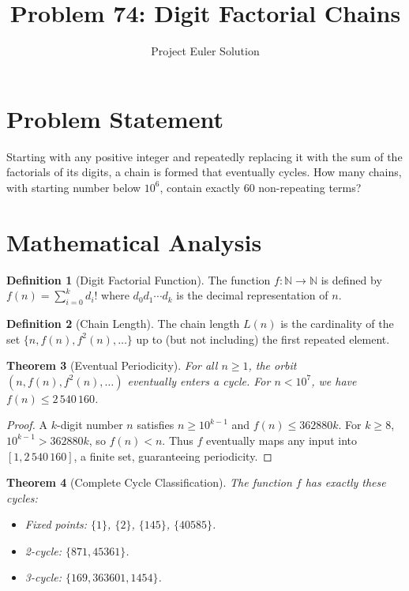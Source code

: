 \documentclass[12pt,a4paper]{article}
\title{Problem 74: Digit Factorial Chains}
\author{Project Euler Solution}
\date{}
\newtheorem{theorem}{Theorem}
\theoremstyle{definition}
\newtheorem{definition}[theorem]{Definition}
\begin{document}
\maketitle

\section{Problem Statement}

Starting with any positive integer and repeatedly replacing it with the sum of the factorials of its digits, a chain is formed that eventually cycles. How many chains, with starting number below $10^6$, contain exactly 60 non-repeating terms?

\section{Mathematical Analysis}

\begin{definition}[Digit Factorial Function]
The function $f: \mathbb{N} \to \mathbb{N}$ is defined by $f(n) = \sum_{i=0}^{k} d_i!$ where $d_0 d_1 \cdots d_k$ is the decimal representation of $n$.
\end{definition}

\begin{definition}[Chain Length]
The chain length $L(n)$ is the cardinality of the set $\{n, f(n), f^2(n), \ldots\}$ up to (but not including) the first repeated element.
\end{definition}

\begin{theorem}[Eventual Periodicity]
For all $n \geq 1$, the orbit $(n, f(n), f^2(n), \ldots)$ eventually enters a cycle. For $n < 10^7$, we have $f(n) \leq 2\,540\,160$.
\end{theorem}

\begin{proof}
A $k$-digit number $n$ satisfies $n \geq 10^{k-1}$ and $f(n) \leq 362880k$. For $k \geq 8$, $10^{k-1} > 362880k$, so $f(n) < n$. Thus $f$ eventually maps any input into $[1, 2\,540\,160]$, a finite set, guaranteeing periodicity.
\end{proof}

\begin{theorem}[Complete Cycle Classification]
The function $f$ has exactly these cycles:
\begin{itemize}
    \item Fixed points: $\{1\}$, $\{2\}$, $\{145\}$, $\{40585\}$.
    \item 2-cycle: $\{871, 45361\}$.
    \item 3-cycle: $\{169, 363601, 1454\}$.
\end{itemize}
\end{theorem}
\end{document}
